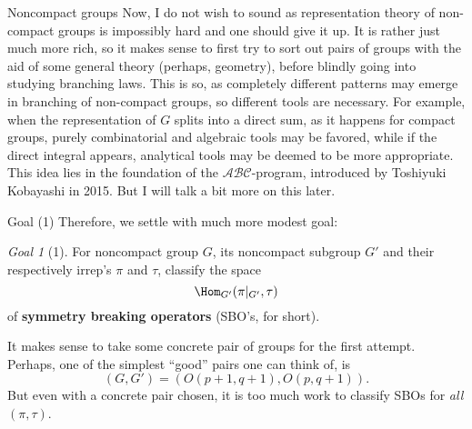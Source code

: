 \documentclass[pdf]{beamer}
\theoremstyle{mystyle}
\theoremstyle{remark}
\newtheorem{goal}{Goal}[section]
\begin{document}
\begin{frame}{Noncompact groups}
{		Now, I do not wish to sound as representation theory of non-compact groups is impossibly hard and one should give it up. It is rather just
		much more rich, so it makes sense to first try to sort out pairs of groups with the aid of some general theory (perhaps, geometry), before blindly going into
		studying branching laws. This is so, as completely different patterns may emerge in branching of non-compact groups, so different tools are necessary.
		For example, when the representation of $G$ splits into a direct sum, as it happens for compact groups, purely combinatorial and algebraic tools may be favored,
		while if the direct integral appears, analytical tools may be deemed to be more appropriate. This idea lies in the foundation of the $\mathcal{ABC}$-program, introduced
		by Toshiyuki Kobayashi in 2015. But I will talk a bit more on this later.
	}
\end{frame}
\begin{frame}{Goal (1)}
	Therefore, we settle with much more modest goal:
	\begin{goal}[1]
		For noncompact group $G$, its noncompact subgroup $G'$ and their respectively irrep's $\pi$ and $\tau$, classify the space\begin{equation*}
			\Hom_{G'}(\pi\kern-0.1cm\mid_{G'},\tau)
		\end{equation*}
		of {\bf symmetry breaking operators} (SBO's, for short).
	\end{goal}
	It makes sense to take some concrete pair of groups for the first attempt. Perhaps, one of the simplest ``good'' pairs one can think of, is \begin{equation*}
		\left( G,G' \right)=(O(p+1,q+1),O(p,q+1)).
	\end{equation*}
	But even with a concrete pair chosen, it is too much work to classify SBOs for {\it all} $(\pi,\tau)$.
\end{frame}
\end{document}
